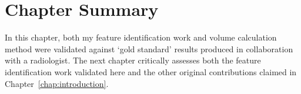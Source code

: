 

\clearpage
\newpage

\section{Chapter Summary}

In this chapter, both my feature identification work and volume calculation method were validated against `gold standard' results produced in collaboration with a radiologist. The next chapter critically assesses both the feature identification work validated here and the other original contributions claimed in Chapter~\ref{chap:introduction}.
